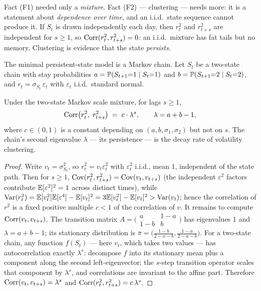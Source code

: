 Fact (F1) needed only a \emph{mixture}. Fact (F2) --- clustering --- needs
more: it is a statement about \emph{dependence over time}, and an i.i.d.\
state sequence cannot produce it. If $S_t$ is drawn independently each day,
then $r_t^2$ and $r_{t+s}^2$ are independent for $s \ge 1$, so
$\operatorname{Corr}(r_t^2, r_{t+s}^2) = 0$: an i.i.d.\ mixture has fat tails but no
memory. Clustering is evidence that the state \emph{persists}.

The minimal persistent-state model is a Markov chain. Let $S_t$ be a
two-state chain with stay probabilities $a = \mathbb{P}(S_{t+1}{=}1 \mid S_t{=}1)$
and $b = \mathbb{P}(S_{t+1}{=}2 \mid S_t{=}2)$, and $r_t = \sigma_{S_t}\,
\varepsilon_t$ with $\varepsilon_t$ i.i.d.\ standard normal.

\begin{proposition}\label{prop:acf}
Under the two-state Markov scale mixture, for lags $s \geq 1$,
\[
  \operatorname{Corr}\bigl(r_t^2,\; r_{t+s}^2\bigr)
  \;=\; c \cdot \lambda^{s},
  \qquad \lambda = a + b - 1,
\]
where $c \in (0, 1)$ is a constant depending on
$(a, b, \sigma_1, \sigma_2)$ but not on $s$. The chain's second eigenvalue
$\lambda$ --- its persistence --- is the decay rate of volatility
clustering.
\end{proposition}

\begin{proof}
Write $v_t = \sigma^2_{S_t}$, so $r_t^2 = v_t \varepsilon_t^2$ with
$\varepsilon_t^2$ i.i.d., mean $1$, independent of the state path. Then for
$s \ge 1$, $\operatorname{Cov}(r_t^2, r_{t+s}^2) = \operatorname{Cov}(v_t, v_{t+s})$ (the independent
$\varepsilon^2$ factors contribute $\mathbb{E}[\varepsilon^2]^2 = 1$ across distinct
times), while $\operatorname{Var}(r_t^2) = \mathbb{E}[v_t^2]\mathbb{E}[\varepsilon^4] - \mathbb{E}[v_t]^2 =
3\mathbb{E}[v_t^2] - \mathbb{E}[v_t]^2 > \operatorname{Var}(v_t)$; hence the correlation of $r^2$ is a
fixed positive multiple $c < 1$ of the correlation of $v$. It remains to
compute $\operatorname{Corr}(v_t, v_{t+s})$. The transition matrix
$A = \bigl(\begin{smallmatrix} a & 1-a \\ 1-b & b \end{smallmatrix}\bigr)$
has eigenvalues $1$ and $\lambda = a + b - 1$; its stationary distribution
is $\bar\pi = \bigl(\frac{1-b}{2-a-b}, \frac{1-a}{2-a-b}\bigr)$. For a
two-state chain, any function $f(S_t)$ --- here $v_t$, which takes two
values --- has autocorrelation exactly $\lambda^s$: decompose $f$ into its
stationary mean plus a component along the second left-eigenvector; the
$s$-step transition operator scales that component by $\lambda^s$, and
correlations are invariant to the affine part. Therefore
$\operatorname{Corr}(v_t, v_{t+s}) = \lambda^s$ and
$\operatorname{Corr}(r_t^2, r_{t+s}^2) = c\,\lambda^s$.
\end{proof}

